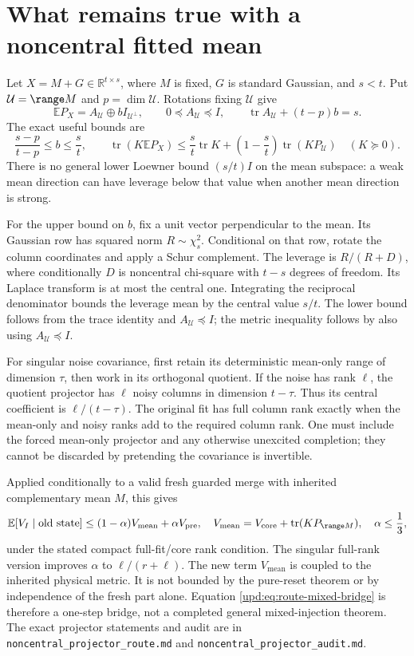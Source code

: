 \documentclass[11pt,oneside,openany,a4paper]{book}
\numberwithin{equation}{chapter}
\theoremstyle{definition}
\theoremstyle{remark}
\newcommand{\R}{\mathbb R}\newcommand{\E}{\mathbb E}\newcommand{\Prb}{\mathbb P}\newcommand{\PP}{\mathbb P}
\DeclareMathOperator{\tr}{tr}\DeclareMathOperator{\rank}{rank}
\newcommand{\sourcefile}[1]{{\small\nolinkurl{#1}}}
\begin{document}
\section{What remains true with a noncentral fitted mean}

Let $X=M+G\in\R^{t\times s}$, where $M$ is fixed, $G$ is standard
Gaussian, and $s<t$.  Put $\mathcal U=\range M$ and
$p=\dim\mathcal U$.  Rotations fixing $\mathcal U$ give
\[
 \E P_X=A_{\mathcal U}\oplus bI_{\mathcal U^\perp},
 \qquad0\preceq A_{\mathcal U}\preceq I,
 \qquad\tr A_{\mathcal U}+(t-p)b=s.
\]
The exact useful bounds are
\begin{equation}
 \frac{s-p}{t-p}\leq b\leq\frac st,
 \qquad
 \tr(K\E P_X)
 \leq\frac st\tr K+\left(1-\frac st\right)\tr(KP_{\mathcal U})
 \quad(K\succeq0).
 \label{upd:eq:route-noncentral}
\end{equation}
There is no general lower Loewner bound $(s/t)I$ on the mean subspace:
a weak mean direction can have leverage below that value when another
mean direction is strong.

For the upper bound on $b$, fix a unit vector perpendicular to the
mean.  Its Gaussian row has squared norm $R\sim\chi_s^2$.  Conditional
on that row, rotate the column coordinates and apply a Schur complement.
The leverage is $R/(R+D)$, where conditionally $D$ is noncentral
chi-square with $t-s$ degrees of freedom.  Its Laplace transform is at
most the central one.  Integrating the reciprocal denominator bounds
the leverage mean by the central value $s/t$.  The lower bound follows
from the trace identity and $A_{\mathcal U}\preceq I$; the metric
inequality follows by also using $A_{\mathcal U}\preceq I$.

For singular noise covariance, first retain its deterministic mean-only
range of dimension $\tau$, then work in its orthogonal quotient.
If the noise has rank $\ell$, the quotient projector has $\ell$ noisy
columns in dimension $t-\tau$.  Thus its central coefficient is
$\ell/(t-\tau)$.  The original fit has full column rank exactly when
the mean-only and noisy ranks add to the required column rank.  One
must include the forced mean-only projector and any otherwise unexcited
completion; they cannot be discarded by pretending the covariance is
invertible.

Applied conditionally to a valid fresh guarded merge with inherited
complementary mean $M$, this gives
\begin{equation}
 \E[V_I\mid\text{old state}]
 \leq(1-\alpha)V_{\mathrm{mean}}+\alpha V_{\mathrm{pre}},
 \quad
 V_{\mathrm{mean}}=V_{\mathrm{core}}+\tr(KP_{\range M}),
 \quad\alpha\leq\frac13,
 \label{upd:eq:route-mixed-bridge}
\end{equation}
under the stated compact full-fit/core rank condition.  The singular
full-rank version improves $\alpha$ to $\ell/(r+\ell)$.  The new term
$V_{\mathrm{mean}}$ is coupled to the inherited physical metric.  It is
not bounded by the pure-reset theorem or by independence of the fresh
part alone.  Equation \eqref{upd:eq:route-mixed-bridge} is therefore a
one-step bridge, not a completed general mixed-injection theorem.
The exact projector statements and audit are in
\sourcefile{noncentral_projector_route.md} and
\sourcefile{noncentral_projector_audit.md}.
\end{document}
